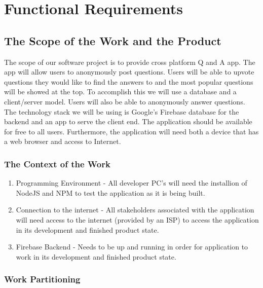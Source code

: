 \documentclass[12pt, titlepage]{article}
\begin{document}
\section{Functional Requirements}

\subsection{The Scope of the Work and the Product}

The scope of our software project is to provide cross platform Q and A app. The app will allow users to anonymously post questions. Users will be able to upvote questions they would like to find the answers to and the most popular questions will be showed at the top. To accomplish this we will use a database and a client/server model. Users will also be able to anonymously answer questions. The technology stack we will be using is Google’s Firebase database for the backend and an app to serve the client end. The application should be available for free to all users. Furthermore, the application will need both a device that has a web browser and access to Internet. 

\subsubsection{The Context of the Work}

\begin{enumerate}
  \item Programming Environment - All developer PC’s will need the installion of NodeJS and NPM to test the application as it is being built.
  \item Connection to the internet - All stakeholders associated with the application will need access to the internet (provided by an ISP) to access the application in its development and finished product state.
  \item Firebase Backend - Needs to be up and running in order for application to work in its development and finished product state.
\end{enumerate}

\subsubsection{Work Partitioning}
\end{document}
